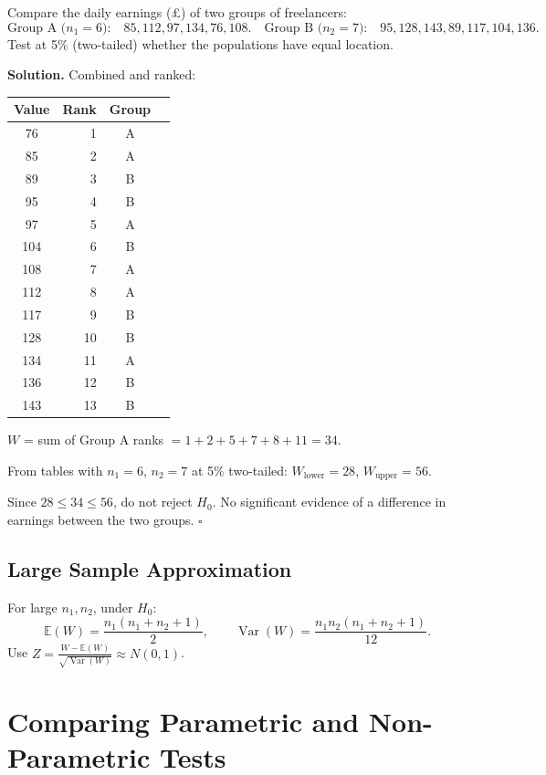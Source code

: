 \documentclass[12pt, a4paper, oneside]{book}
\theoremstyle{definition}
\theoremstyle{plain}
\theoremstyle{remark}
\newcommand{\E}{\mathbb{E}}
\newcommand{\Var}{\operatorname{Var}}
\newenvironment{solution}
  {\par\medskip\noindent\textbf{Solution.}\quad}
  {\hfill$\square$\par\medskip}
\begin{document}
\begin{workedexample}
Compare the daily earnings (£) of two groups of freelancers:
\[
  \text{Group A (}n_1=6\text{):}\quad 85, 112, 97, 134, 76, 108.
  \quad
  \text{Group B (}n_2=7\text{):}\quad 95, 128, 143, 89, 117, 104, 136.
\]
Test at 5\% (two-tailed) whether the populations have equal location.

\begin{solution}
Combined and ranked:
\begin{center}
\begin{tabular}{crcc}
\toprule
Value & Rank & Group & \\
\midrule
76  & 1  & A & \\
85  & 2  & A & \\
89  & 3  & B & \\
95  & 4  & B & \\
97  & 5  & A & \\
104 & 6  & B & \\
108 & 7  & A & \\
112 & 8  & A & \\
117 & 9  & B & \\
128 & 10 & B & \\
134 & 11 & A & \\
136 & 12 & B & \\
143 & 13 & B & \\
\bottomrule
\end{tabular}
\end{center}

$W$ = sum of Group A ranks $= 1+2+5+7+8+11 = 34$.

From tables with $n_1=6$, $n_2=7$ at 5\% two-tailed:
$W_{\text{lower}}=28$, $W_{\text{upper}}=56$.

Since $28 \le 34 \le 56$, do not reject $H_0$.  No significant evidence of
a difference in earnings between the two groups.
\end{solution}
\end{workedexample}

\subsection{Large Sample Approximation}

For large $n_1,n_2$, under $H_0$:
\[
  \E(W) = \frac{n_1(n_1+n_2+1)}{2}, \qquad
  \Var(W) = \frac{n_1 n_2(n_1+n_2+1)}{12}.
\]
Use $Z = \frac{W - \E(W)}{\sqrt{\Var(W)}} \approx N(0,1)$.

\section{Comparing Parametric and Non-Parametric Tests}
\end{document}
